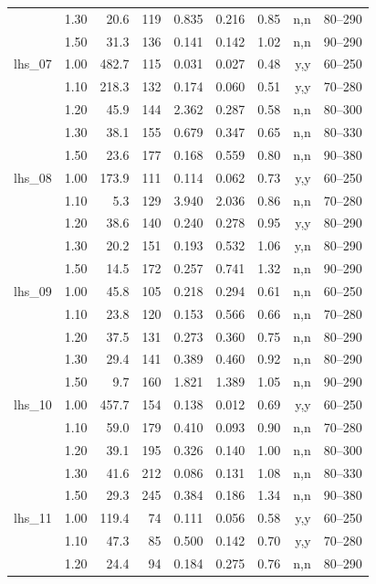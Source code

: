 \begin{longtable}{@{}l r r r r r r r r@{}}
 & 1.30 & 20.6 & 119 & 0.835 & 0.216 & 0.85 & n,n & 80--290 \\
 & 1.50 & 31.3 & 136 & 0.141 & 0.142 & 1.02 & n,n & 90--290 \\
\addlinespace
lhs\_07 & 1.00 & 482.7 & 115 & 0.031 & 0.027 & 0.48 & y,y & 60--250 \\
 & 1.10 & 218.3 & 132 & 0.174 & 0.060 & 0.51 & y,y & 70--280 \\
 & 1.20 & 45.9 & 144 & 2.362 & 0.287 & 0.58 & n,n & 80--300 \\
 & 1.30 & 38.1 & 155 & 0.679 & 0.347 & 0.65 & n,n & 80--330 \\
 & 1.50 & 23.6 & 177 & 0.168 & 0.559 & 0.80 & n,n & 90--380 \\
\addlinespace
lhs\_08 & 1.00 & 173.9 & 111 & 0.114 & 0.062 & 0.73 & y,y & 60--250 \\
 & 1.10 & 5.3 & 129 & 3.940 & 2.036 & 0.86 & n,n & 70--280 \\
 & 1.20 & 38.6 & 140 & 0.240 & 0.278 & 0.95 & y,y & 80--290 \\
 & 1.30 & 20.2 & 151 & 0.193 & 0.532 & 1.06 & y,n & 80--290 \\
 & 1.50 & 14.5 & 172 & 0.257 & 0.741 & 1.32 & n,n & 90--290 \\
\addlinespace
lhs\_09 & 1.00 & 45.8 & 105 & 0.218 & 0.294 & 0.61 & n,n & 60--250 \\
 & 1.10 & 23.8 & 120 & 0.153 & 0.566 & 0.66 & n,n & 70--280 \\
 & 1.20 & 37.5 & 131 & 0.273 & 0.360 & 0.75 & n,n & 80--290 \\
 & 1.30 & 29.4 & 141 & 0.389 & 0.460 & 0.92 & n,n & 80--290 \\
 & 1.50 & 9.7 & 160 & 1.821 & 1.389 & 1.05 & n,n & 90--290 \\
\addlinespace
lhs\_10 & 1.00 & 457.7 & 154 & 0.138 & 0.012 & 0.69 & y,y & 60--250 \\
 & 1.10 & 59.0 & 179 & 0.410 & 0.093 & 0.90 & n,n & 70--280 \\
 & 1.20 & 39.1 & 195 & 0.326 & 0.140 & 1.00 & n,n & 80--300 \\
 & 1.30 & 41.6 & 212 & 0.086 & 0.131 & 1.08 & n,n & 80--330 \\
 & 1.50 & 29.3 & 245 & 0.384 & 0.186 & 1.34 & n,n & 90--380 \\
\addlinespace
lhs\_11 & 1.00 & 119.4 & 74 & 0.111 & 0.056 & 0.58 & y,y & 60--250 \\
 & 1.10 & 47.3 & 85 & 0.500 & 0.142 & 0.70 & y,y & 70--280 \\
 & 1.20 & 24.4 & 94 & 0.184 & 0.275 & 0.76 & n,n & 80--290 \\

\end{longtable}
